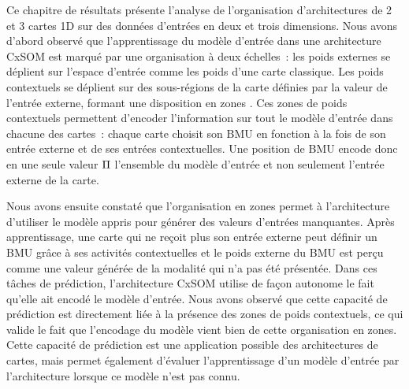 \documentclass[../main]{subfiles}
\begin{document}
Ce chapitre de résultats présente l'analyse de l'organisation d'architectures de 2 et 3 cartes 1D sur des données d'entrées en deux et trois dimensions.
Nous avons d'abord observé que l'apprentissage du modèle d'entrée dans une architecture CxSOM est marqué par une organisation à deux échelles~: les poids externes se déplient sur l'espace d'entrée comme les poids d'une carte classique. Les poids contextuels se déplient sur des sous-régions de la carte définies par la valeur de l'entrée externe, formant une disposition en \og zones \fg{}.
Ces zones de poids contextuels permettent d'encoder l'information sur tout le modèle d'entrée dans chacune des cartes~: 
chaque carte choisit son BMU en fonction à la fois de son entrée externe et de ses entrées contextuelles. Une position de BMU encode donc en une seule valeur $\Pi$ l'ensemble du modèle d'entrée et non seulement l'entrée externe de la carte.


Nous avons ensuite constaté que l'organisation en zones permet à l'architecture d'utiliser le modèle appris pour générer des valeurs d'entrées manquantes.
Après apprentissage, une carte qui ne reçoit plus son entrée externe peut définir un BMU grâce à ses activités contextuelles et le poids externe du BMU est perçu comme une valeur générée de la modalité qui n'a pas été présentée.
Dans ces tâches de prédiction, l'architecture CxSOM utilise de façon autonome le fait qu'elle ait encodé le modèle d'entrée. 
Nous avons observé que cette capacité de prédiction est directement liée à la présence des zones de poids contextuels, ce qui valide le fait que l'encodage du modèle vient bien de cette organisation en zones.
Cette capacité de prédiction est une application possible des architectures de cartes, mais permet également d'évaluer l'apprentissage d'un modèle d'entrée par l'architecture lorsque ce modèle n'est pas connu.
\end{document}
